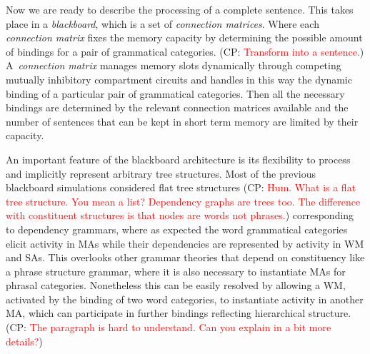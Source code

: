 \documentclass[10pt]{article}
\newcommand{\noteCP}[1]{(CP: \textcolor{red}{#1})}
\begin{document}
Now we are ready to describe the processing of a complete sentence.
This takes place in a \emph{blackboard}, which is a set of \emph{connection matrices}. Where each \emph{connection matrix} fixes the memory capacity by determining the possible amount of bindings for a pair of grammatical categories.
\noteCP{Transform into a sentence.}
A~\emph{connection matrix} manages memory slots dynamically through competing mutually inhibitory compartment circuits and handles in this way the dynamic binding of a particular pair of grammatical categories.
Then all the necessary bindings are determined by the relevant connection matrices available and the number of sentences that can be kept in short term memory are limited by their capacity.




An important feature of the blackboard architecture is its flexibility to process and implicitly represent arbitrary tree structures.
Most of the previous blackboard simulations considered flat tree structures
\noteCP{Hum. What is a flat tree structure. You mean a list? Dependency graphs are trees too. The difference with constituent structures is that nodes are words not phrases.}
corresponding to dependency grammars\cite{nivre2005dependency}, where as expected the word grammatical categories elicit activity in MAs while their dependencies are represented by activity in WM and SAs.
This overlooks other grammar theories that depend on constituency like a phrase structure grammar\cite{gazdar1982phrase}, where it is also necessary to instantiate MAs for phrasal categories.
Nonetheless this can be easily resolved by allowing a WM, activated by the binding of two word categories, to instantiate activity in another MA, which can participate in further bindings reflecting hierarchical structure.
\noteCP{The paragraph is hard to understand. Can you explain in a bit more details?}
\end{document}
